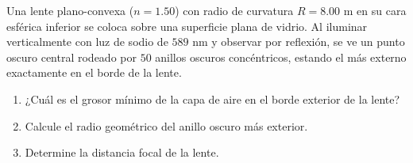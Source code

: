 \item Una lente plano-convexa ($n = 1.50$) con radio de curvatura $R = 8.00\text{ m}$ en su cara esférica inferior se coloca sobre una superficie plana de vidrio. Al iluminar verticalmente con luz de sodio de $589\text{ nm}$ y observar por reflexión, se ve un punto oscuro central rodeado por $50$ anillos oscuros concéntricos, estando el más externo exactamente en el borde de la lente.
\begin{enumerate}
    \item ¿Cuál es el grosor mínimo de la capa de aire en el borde exterior de la lente?
    \item Calcule el radio geométrico del anillo oscuro más exterior.
    \item Determine la distancia focal de la lente.
\end{enumerate}